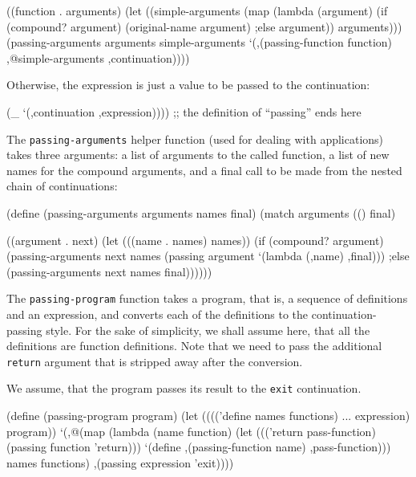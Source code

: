 \begin{Snippet}
    ((function . arguments)
     (let ((simple-arguments (map (lambda (argument)
				    (if (compound? argument)
					(original-name argument)
                                    ;else
                                        argument))
				  arguments)))
       (passing-arguments arguments simple-arguments
			  `(,(passing-function function)
			    ,@simple-arguments
			    ,continuation))))
\end{Snippet}

Otherwise, the expression is just a value to be passed to the continuation:

\begin{Snippet}
    (_
     `(,continuation ,expression))))
  ;; the definition of ``passing'' ends here
\end{Snippet}

The \texttt{passing-arguments} helper function (used for dealing with
applications) takes three arguments: a list of arguments to the
called function, a list of new names for the compound arguments,
and a final call to be made from the nested chain of continuations:

\begin{Snippet}
(define (passing-arguments arguments names final)
  (match arguments
    (()
     final)

    ((argument . next)
     (let (((name . names) names))
       (if (compound? argument)
	   (passing-arguments next names
			      (passing argument
                                `(lambda (,name) ,final)))
       ;else
	   (passing-arguments next names final))))))
\end{Snippet}

The \texttt{passing-program} function takes a program, that is,
a sequence of definitions and an expression, and converts each of the
definitions to the continuation-passing style. For the sake
of simplicity, we shall assume here, that all the definitions
are function definitions. Note that we need to pass the additional
\texttt{return} argument that is stripped away after the conversion.

We assume, that the program passes its result to the \texttt{exit}
continuation.

\begin{Snippet}
(define (passing-program program)
  (let (((('define names functions) ... expression) program))
    `(,@(map (lambda (name function)
               (let ((('return pass-function) (passing function
                                                       'return)))
	          `(define ,(passing-function name)
                           ,pass-function)))
	     names functions)
      ,(passing expression 'exit))))
\end{Snippet}

